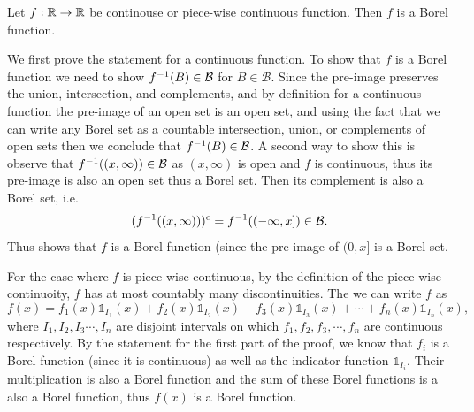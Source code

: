 \begin{problem}
	Let $ f:\mathbb{R} \to \mathbb{R} $ be continouse or piece-wise continuous function. Then $ f $ is a Borel function.
\end{problem}
\begin{solution}
	We first prove the statement for a continuous function. To show that $ f $ is a Borel function we need to show $ f^{-1}(B) \in \mathcal{B} $ for $ B \in \mathcal{B}$. Since the pre-image preserves the union, intersection, and complements, and by definition for a continuous function the pre-image of an open set is an open set, and using the fact that we can write any Borel set as a countable intersection, union, or complements of open sets then we conclude that $ f^{-1}(B) \in \mathcal{B} $.
	A second way to show this is observe that $ f^{-1}((x,\infty)) \in \mathcal{B} $ as $ (x,\infty) $ is open and $ f $ is continuous, thus its pre-image is also an open set thus a Borel set. Then its complement is also a Borel set, i.e.
	\[ (f^{-1}((x,\infty)))^c = f^{-1}((-\infty,x]) \in \mathcal{B}. \]
	Thus shows that $ f $ is a Borel function (since the pre-image of $ (0,x] $ is a Borel set.
	
	For the case where $ f $ is piece-wise continuous, by the definition of the piece-wise continuoity, $ f $ has at most countably many discontinuities. The we can write $ f $ as 
	\[ f(x) = f_1(x)\mathds{1}_{I_1}(x) + f_2(x)\mathds{1}_{I_2}(x) + f_3(x)\mathds{1}_{I_3}(x)  + \cdots + f_n(x)\mathds{1}_{I_n}(x),  \]
	where $ I_1,I_2,I_3\cdots,I_n  $ are disjoint intervals on which $ f_1,f_2,f_3,\cdots, f_n $ are continuous respectively. By the statement for the first part of the proof, we know that $ f_i $ is a Borel function (since it is continuous) as well as the indicator function $ \mathds{1}_{I_i} $. Their multiplication is also a Borel function and the sum of these Borel functions is a also a Borel function, thus $ f(x) $ is a Borel function.
\end{solution}

